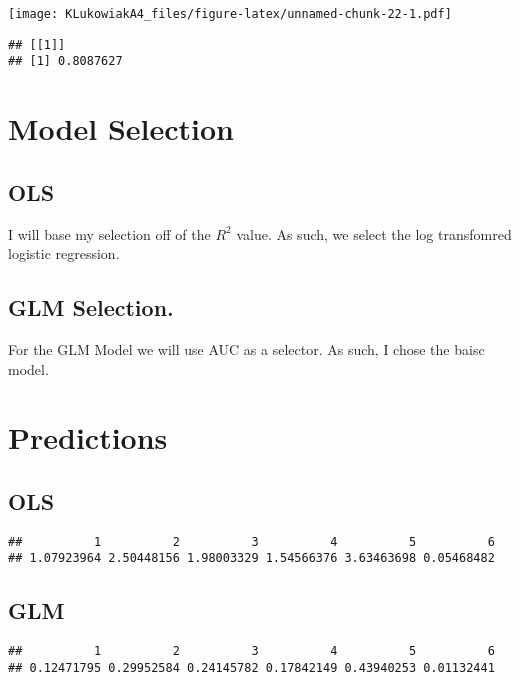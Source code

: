 \documentclass[]{article}
\begin{document}
\texttt{[image: KLukowiakA4\_files/figure-latex/unnamed-chunk-22-1.pdf]}

\begin{verbatim}
## [[1]]
## [1] 0.8087627
\end{verbatim}

\hypertarget{model-selection}{%
\section{Model Selection}\label{model-selection}}

\hypertarget{ols}{%
\subsection{OLS}\label{ols}}

I will base my selection off of the \(R^2\) value. As such, we select
the log transfomred logistic regression.

\hypertarget{glm-selection.}{%
\subsection{GLM Selection.}\label{glm-selection.}}

For the GLM Model we will use AUC as a selector. As such, I chose the
baisc model.

\hypertarget{predictions}{%
\section{Predictions}\label{predictions}}

\hypertarget{ols-1}{%
\subsection{OLS}\label{ols-1}}

\begin{verbatim}
##          1          2          3          4          5          6 
## 1.07923964 2.50448156 1.98003329 1.54566376 3.63463698 0.05468482
\end{verbatim}

\hypertarget{glm}{%
\subsection{GLM}\label{glm}}

\begin{verbatim}
##          1          2          3          4          5          6 
## 0.12471795 0.29952584 0.24145782 0.17842149 0.43940253 0.01132441
\end{verbatim}
\end{document}
